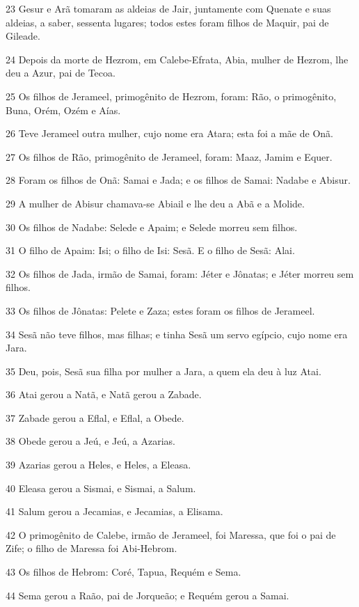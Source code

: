 \par 23 Gesur e Arã tomaram as aldeias de Jair, juntamente com Quenate e suas aldeias, a saber, sessenta lugares; todos estes foram filhos de Maquir, pai de Gileade.
\par 24 Depois da morte de Hezrom, em Calebe-Efrata, Abia, mulher de Hezrom, lhe deu a Azur, pai de Tecoa.
\par 25 Os filhos de Jerameel, primogênito de Hezrom, foram: Rão, o primogênito, Buna, Orém, Ozém e Aías.
\par 26 Teve Jerameel outra mulher, cujo nome era Atara; esta foi a mãe de Onã.
\par 27 Os filhos de Rão, primogênito de Jerameel, foram: Maaz, Jamim e Equer.
\par 28 Foram os filhos de Onã: Samai e Jada; e os filhos de Samai: Nadabe e Abisur.
\par 29 A mulher de Abisur chamava-se Abiail e lhe deu a Abã e a Molide.
\par 30 Os filhos de Nadabe: Selede e Apaim; e Selede morreu sem filhos.
\par 31 O filho de Apaim: Isi; o filho de Isi: Sesã. E o filho de Sesã: Alai.
\par 32 Os filhos de Jada, irmão de Samai, foram: Jéter e Jônatas; e Jéter morreu sem filhos.
\par 33 Os filhos de Jônatas: Pelete e Zaza; estes foram os filhos de Jerameel.
\par 34 Sesã não teve filhos, mas filhas; e tinha Sesã um servo egípcio, cujo nome era Jara.
\par 35 Deu, pois, Sesã sua filha por mulher a Jara, a quem ela deu à luz Atai.
\par 36 Atai gerou a Natã, e Natã gerou a Zabade.
\par 37 Zabade gerou a Eflal, e Eflal, a Obede.
\par 38 Obede gerou a Jeú, e Jeú, a Azarias.
\par 39 Azarias gerou a Heles, e Heles, a Eleasa.
\par 40 Eleasa gerou a Sismai, e Sismai, a Salum.
\par 41 Salum gerou a Jecamias, e Jecamias, a Elisama.
\par 42 O primogênito de Calebe, irmão de Jerameel, foi Maressa, que foi o pai de Zife; o filho de Maressa foi Abi-Hebrom.
\par 43 Os filhos de Hebrom: Coré, Tapua, Requém e Sema.
\par 44 Sema gerou a Raão, pai de Jorqueão; e Requém gerou a Samai.
